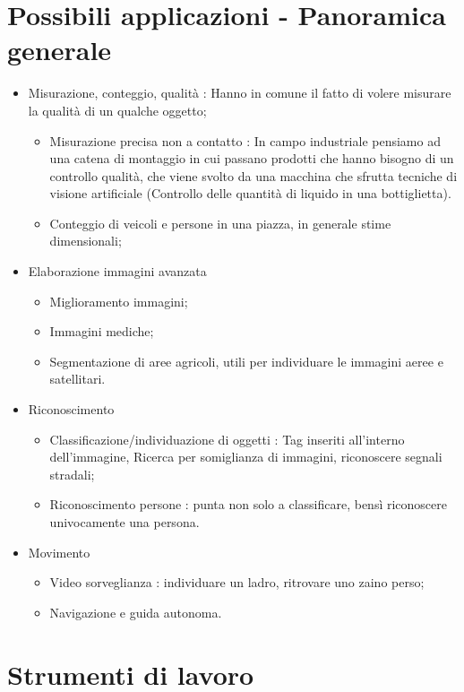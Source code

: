 \section{Possibili applicazioni - Panoramica generale}
\begin{itemize}
	\item Misurazione, conteggio, qualità : Hanno in comune il fatto di volere misurare la qualità di un qualche oggetto;
	\begin{itemize}
		\item Misurazione precisa non a contatto : In campo industriale pensiamo ad una catena di montaggio in cui passano prodotti che hanno bisogno di un controllo qualità, che viene svolto da una macchina che sfrutta tecniche di visione artificiale (Controllo delle quantità di liquido in una bottiglietta).
		\item Conteggio di veicoli e persone in una piazza, in generale stime dimensionali;
	\end{itemize}
	\item Elaborazione immagini avanzata
	\begin{itemize}
		\item Miglioramento immagini;
		\item Immagini mediche;
		\item Segmentazione di aree agricoli, utili per individuare le immagini aeree e satellitari.
	\end{itemize}
	\item Riconoscimento
	\begin{itemize}
		\item Classificazione/individuazione di oggetti : Tag inseriti all'interno dell'immagine, Ricerca per somiglianza di immagini, riconoscere segnali stradali;
		\item Riconoscimento persone : punta non solo a classificare, bensì riconoscere univocamente una persona.
	\end{itemize}
	\item Movimento
	\begin{itemize}
		\item Video sorveglianza : individuare un ladro, ritrovare uno zaino perso;
		\item Navigazione e guida autonoma.
	\end{itemize}
\end{itemize}

\section{Strumenti di lavoro}

